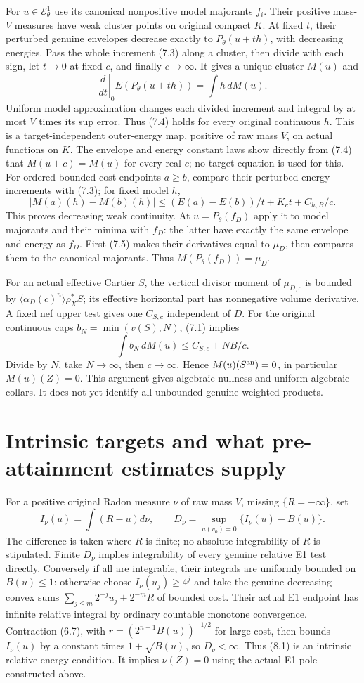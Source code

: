 \documentclass[10pt]{article}
\newcommand{\EE}{\mathcal E^1_\theta}
\begin{document}
For $u\in\EE$ use its canonical nonpositive model majorants $f_i$.
Their positive mass-$V$ measures have weak cluster points on original
compact $K$. At fixed $t$, their perturbed genuine envelopes decrease
exactly to $P_\theta(u+th)$, with decreasing energies. Pass the whole
increment (7.3) along a cluster, then divide with each sign, let $t\to0$
at fixed $c$, and finally $c\to\infty$. It gives a unique cluster $M(u)$
and
\[
 \left.\frac d{dt}\right|_0E(P_\theta(u+th))=\int h\,dM(u).
 \tag{7.4}
\]
Uniform model approximation changes each divided increment and integral
by at most $V$ times its sup error. Thus (7.4) holds for every original
continuous $h$. This is a target-independent outer-energy map, positive
of raw mass $V$, on actual functions on $K$.
The envelope and energy constant laws show directly from (7.4) that
$M(u+c)=M(u)$ for every real $c$; no target equation is used for this.
For ordered bounded-cost endpoints $a\geq b$, compare their perturbed
energy increments with (7.3); for fixed model $h$,
\[
 |M(a)(h)-M(b)(h)|\leq (E(a)-E(b))/t+K_ct+C_{h,B}/c.
 \tag{7.5}
\]
This proves decreasing weak continuity. At $u=P_\theta(f_D)$ apply
it to model majorants and their minima with $f_D$: the latter have
exactly the same envelope and energy as $f_D$. First (7.5) makes their
derivatives equal to $\mu_D$, then compares them to the canonical
majorants. Thus $M(P_\theta(f_D))=\mu_D$.

For an actual effective Cartier $S$, the vertical divisor moment of
$\mu_{D,c}$ is bounded by
$\langle\alpha_D(c)^n\rangle\rho_X^*S$; its effective horizontal
part has nonnegative volume derivative. A fixed nef upper test gives
one $C_{S,c}$ independent of $D$. For the original continuous caps
$b_N=\min(v(S),N)$, (7.1) implies
\[
 \int b_N\,dM(u)\leq C_{S,c}+NB/c.
 \tag{7.6}
\]
Divide by $N$, take $N\to\infty$, then $c\to\infty$.
Hence $M(u)(S^{\rm an})=0$, in particular $M(u)(Z)=0$.
This argument gives algebraic nullness and uniform algebraic collars.
It does not yet identify all unbounded genuine weighted products.

\section{Intrinsic targets and what pre-attainment estimates supply}
For a positive original Radon measure $\nu$ of raw mass $V$, missing
$\{R=-\infty\}$, set
\[
 I_\nu(u)=\int(R-u)d\nu,\qquad
 D_\nu=\sup_{u(v_0)=0}\{I_\nu(u)-B(u)\}.
 \tag{8.1}
\]
The difference is taken where $R$ is finite; no absolute integrability
of $R$ is stipulated. Finite $D_\nu$ implies integrability of every
genuine relative E1 test directly. Conversely if all are integrable,
their integrals are uniformly bounded on $B(u)\leq1$: otherwise choose
$I_\nu(u_j)\geq4^j$ and take the genuine decreasing convex sums
$\sum_{j\leq m}2^{-j}u_j+2^{-m}R$ of bounded cost. Their actual E1
endpoint has infinite relative integral by ordinary countable monotone
convergence. Contraction (6.7), with $r=(2^{n+1}B(u))^{-1/2}$ for
large cost, then bounds $I_\nu(u)$ by a constant times $1+\sqrt{B(u)}$,
so $D_\nu<\infty$. Thus (8.1) is an intrinsic relative energy condition.
It implies $\nu(Z)=0$ using the actual E1 pole constructed above.
\end{document}
